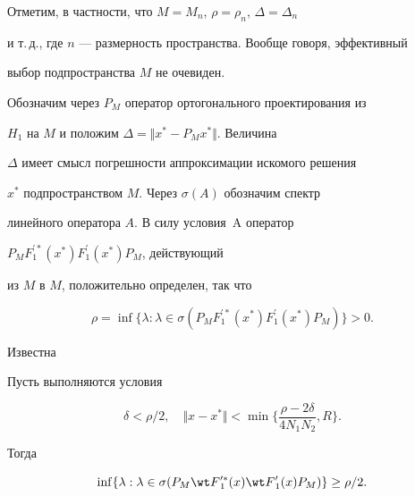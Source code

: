 \begin{notenonum}


Отметим, в частности, что $M=M_n$, $\rho=\rho_n$, $\Delta=\Delta_n$


и т.\,д., где $n$ --- размерность пространства. Вообще говоря, эффективный


выбор подпространства $M$ не очевиден.


\end{notenonum}





Обозначим через $P_M$ оператор ортогонального проектирования из


$H_1$ на $M$ и положим $\Delta=\Vert x^* -P_M x^* \Vert$. Величина


$\Delta$ имеет смысл погрешности аппроксимации искомого решения


$x^*$ подпространством $M$. Через $\sigma(A)$ обозначим спектр


линейного оператора $A$. В силу условия~A оператор


$P_M F_1^{\prime *}(x^*) F_1^{\prime}(x^*)P_M$, действующий


из $M$ в $M$, положительно определен, так что


$$


\rho=\inf \{ \lambda: \lambda \in


\sigma (P_M F_1^{\prime *}(x^*) F_1^{\prime}(x^*)P_M) \}>0.


$$





Известна





\begin{lemnonum}


Пусть выполняются условия


\begin{equation}


\delta< \rho/2, \quad


\Vert x-x^* \Vert <


\min \bigg\{  \frac{\rho-2\delta }{4 N_1 N_2}, R \bigg\}.


\end{equation}


Тогда


\begin{equation}


\inf \{ \lambda: \lambda \in


\sigma (P_M {\wt F}{}_1^{\prime *}(x)


{\wt F}{}_1^{\prime}(x) P_M) \} \geq\rho/2.


\end{equation}


\end{lemnonum}


